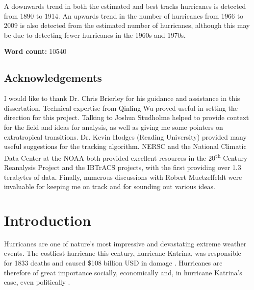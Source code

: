 \documentclass[pdftex,12pt,a4paper]{report}
\newcommand{\ts}{\textsuperscript}
\begin{document}
A downwards trend in both the estimated and best tracks hurricanes is detected from 1890 to 1914. An
upwards trend in the number of hurricanes from 1966 to 2009 is also detected from the estimated
number of hurricanes, although this may be due to detecting fewer hurricanes in the 1960s and 1970s.

\begin{center}
\textbf{Word count:} 10540 %
\end{center}

\newpage
\section*{Acknowledgements}

I would like to thank Dr. Chris Brierley for his guidance and assistance in this dissertation.
Technical expertise from Qinling Wu proved useful in setting the direction for this project.
Talking to Joshua Studholme helped to provide context for the field and ideas for analysis, as well
as giving me some pointers on extratropical transitions. %
Dr. Kevin Hodges (Reading University) provided many useful suggestions for the tracking algorithm.
NERSC and the National Climatic Data Center at the NOAA both provided excellent resources in the
20\ts{th} Century Reanalysis Project and the IBTrACS projects, with the first providing over 1.3
terabytes of data.
Finally, numerous discussions with Robert Muetzelfeldt were invaluable for keeping me on track and
for sounding out various ideas.

\newpage

\tableofcontents

\chapter{Introduction}


Hurricanes are one of nature's most impressive and devastating extreme weather events. The costliest
hurricane this century, hurricane Katrina, was responsible for 1833 deaths and caused \$108
billion USD in damage \parencite{knabb2006tropical}. %
Hurricanes are therefore of great importance socially,
economically and, in hurricane Katrina's case, even politically \parencite{kellner2007katrina}.
\end{document}
